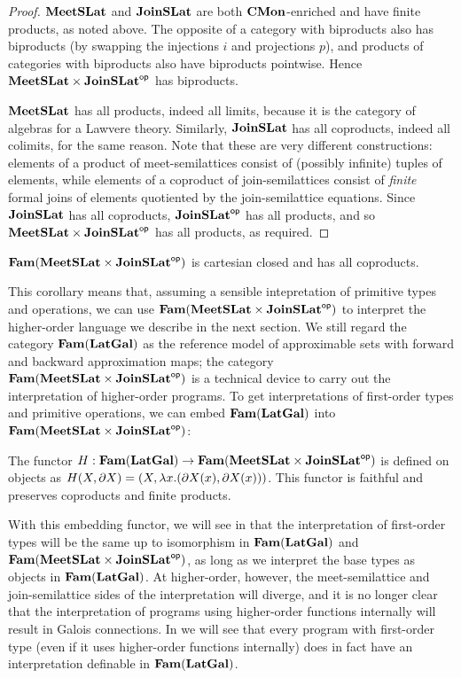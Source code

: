 \begin{proof}
  $\mathbf{MeetSLat}$ and $\mathbf{JoinSLat}$ are both $\mathbf{CMon}$-enriched and have
  finite products, as noted above. The opposite of a category with
  biproducts also has biproducts (by swapping the injections $i$ and
  projections $p$), and products of categories with biproducts also
  have biproducts pointwise. Hence $\mathbf{MeetSLat} \times \mathbf{JoinSLat}^{\mathsf{op}}$
  has biproducts.

  $\mathbf{MeetSLat}$ has all products, indeed all limits, because it is the
  category of algebras for a Lawvere theory. Similarly, $\mathbf{JoinSLat}$
  has all coproducts, indeed all colimits, for the same reason. Note
  that these are very different constructions: elements of a product
  of meet-semilattices consist of (possibly infinite) tuples of
  elements, while elements of a coproduct of join-semilattices consist
  of \emph{finite} formal joins of elements quotiented by the
  join-semilattice equations. Since $\mathbf{JoinSLat}$ has all coproducts,
  $\mathbf{JoinSLat}^{\mathsf{op}}$ has all products, and so
  $\mathbf{MeetSLat} \times \mathbf{JoinSLat}^{\mathsf{op}}$ has all products, as required.
\end{proof}

\begin{corollary}
  \label{cor:mslat-jslat-bcc}
  $\mathbf{Fam}(\mathbf{MeetSLat} \times \mathbf{JoinSLat}^{\mathsf{op}})$ is cartesian closed and has
  all coproducts.
\end{corollary}

This corollary means that, assuming a sensible intepretation of
primitive types and operations, we can use
$\mathbf{Fam}(\mathbf{MeetSLat} \times \mathbf{JoinSLat}^{\mathsf{op}})$ to interpret the higher-order
language we describe in the next section. We still regard the category
$\mathbf{Fam}(\mathbf{LatGal})$ as the reference model of approximable sets with
forward and backward approximation maps; the category
$\mathbf{Fam}(\mathbf{MeetSLat} \times \mathbf{JoinSLat}^{\mathsf{op}})$ is a technical device to carry
out the interpretation of higher-order programs. To get
interpretations of first-order types and primitive operations, we can
embed $\mathbf{Fam}(\mathbf{LatGal})$ into $\mathbf{Fam}(\mathbf{MeetSLat} \times \mathbf{JoinSLat}^{\mathsf{op}})$:

\begin{proposition}
  \label{prop:ho-embedding}
  The functor
  $H : \mathbf{Fam}(\mathbf{LatGal}) \to \mathbf{Fam}(\mathbf{MeetSLat} \times \mathbf{JoinSLat}^{\mathsf{op}})$ is defined
  on objects as
  $H(X, \partial X) = (X, \lambda x. (\partial X(x), \partial
  X(x)))$. This functor is faithful and preserves coproducts and
  finite products.
\end{proposition}

With this embedding functor, we will see in
 that the interpretation of
first-order types will be the same up to isomorphism in
$\mathbf{Fam}(\mathbf{LatGal})$ and $\mathbf{Fam}(\mathbf{MeetSLat} \times \mathbf{JoinSLat}^{\mathsf{op}})$, as long as
we interpret the base types as objects in $\mathbf{Fam}(\mathbf{LatGal})$. At
higher-order, however, the meet-semilattice and join-semilattice sides
of the interpretation will diverge, and it is no longer clear that the
interpretation of programs using higher-order functions internally
will result in Galois connections. In  we will
see that every program with first-order type (even if it uses
higher-order functions internally) does in fact have an interpretation
definable in $\mathbf{Fam}(\mathbf{LatGal})$.

